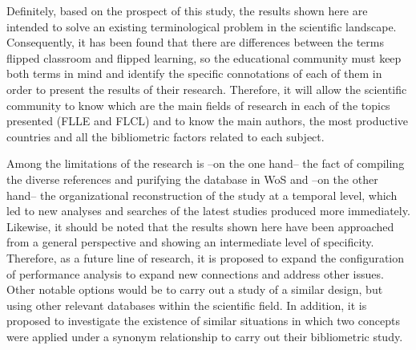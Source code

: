 \documentclass{textolivre}
\begin{document}
Definitely, based on the prospect of this study, the results shown here are intended to solve an existing terminological problem in the scientific landscape. Consequently, it has been found that there are differences between the terms flipped classroom and flipped learning, so the educational community must keep both terms in mind and identify the specific connotations of each of them in order to present the results of their research. Therefore, it will allow the scientific community to know which are the main fields of research in each of the topics presented (FLLE and FLCL) and to know the main authors, the most productive countries and all the bibliometric factors related to each subject.

Among the limitations of the research is –on the one hand– the fact of compiling the diverse references and purifying the database in WoS and –on the other hand– the organizational reconstruction of the study at a temporal level, which led to new analyses and searches of the latest studies produced more immediately. Likewise, it should be noted that the results shown here have been approached from a general perspective and showing an intermediate level of specificity. Therefore, as a future line of research, it is proposed to expand the configuration of performance analysis to expand new connections and address other issues. Other notable options would be to carry out a study of a similar design, but using other relevant databases within the scientific field. In addition, it is proposed to investigate the existence of similar situations in which two concepts were applied under a synonym relationship to carry out their bibliometric study.

\printbibliography\label{sec-bib}
\end{document}
